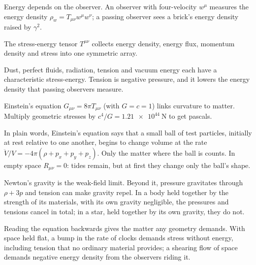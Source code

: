 \begin{chaptersummary}
\item Energy depends on the observer. An observer with four-velocity $w^{\mu}$
  measures the energy density $\rho_{w} = T_{\mu\nu}w^{\mu}w^{\nu}$; a passing
  observer sees a brick's energy density raised by $\gamma^{2}$.
\item The stress-energy tensor $T^{\mu\nu}$ collects energy density, energy
  flux, momentum density and stress into one symmetric array.
\item Dust, perfect fluids, radiation, tension and vacuum energy each have a
  characteristic stress-energy. Tension is negative pressure, and it lowers the
  energy density that passing observers measure.
\item Einstein's equation $G_{\mu\nu} = 8\pi T_{\mu\nu}$ (with $G = c = 1$) links
  curvature to matter. Multiply geometric stresses by
  $c^{4}/G = \SI{1.21e44}{\newton}$ to get pascals.
\item In plain words, Einstein's equation says that a small ball of test
  particles, initially at rest relative to one another, begins to change
  volume at the rate $\ddot V/V = -4\pi(\rho + p_{x} + p_{y} + p_{z})$. Only
  the matter where the ball is counts. In empty space $R_{\mu\nu} = 0$: tides
  remain, but at first they change only the ball's shape.
\item Newton's gravity is the weak-field limit. Beyond it, pressure gravitates
  through $\rho + 3p$ and tension can make gravity repel. In a body held
  together by the strength of its materials, with its own gravity negligible,
  the pressures and tensions cancel in total; in a star, held together by its
  own gravity, they do not.
\item Reading the equation backwards gives the matter any geometry demands.
  With space held flat, a bump in the rate of clocks demands stress without
  energy, including tension that no ordinary material provides; a shearing
  flow of space demands negative energy density from the observers riding
  it.
\end{chaptersummary}

